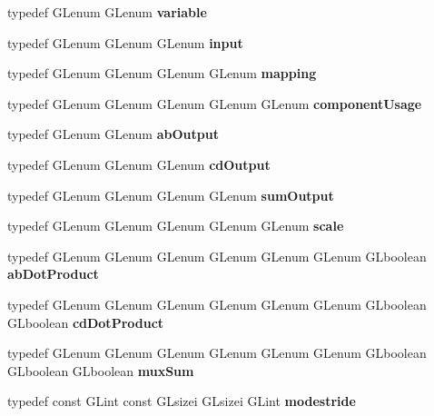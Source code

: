 \begin{DoxyCompactItemize}
\item 
typedef G\+Lenum G\+Lenum {\bfseries variable}\label{_s_d_l__opengl_8h_aac5473f0a0d0d38841ea8d37c5ca032d}

\item 
typedef G\+Lenum G\+Lenum G\+Lenum {\bfseries input}\label{_s_d_l__opengl_8h_ad3c78daa7d8673f71649d4840c641779}

\item 
typedef G\+Lenum G\+Lenum G\+Lenum G\+Lenum {\bfseries mapping}\label{_s_d_l__opengl_8h_aa4f194e5160ccbb5a8e83ab6ef4676d2}

\item 
typedef G\+Lenum G\+Lenum G\+Lenum G\+Lenum G\+Lenum {\bfseries component\+Usage}\label{_s_d_l__opengl_8h_ac91702bfd72ddae881fca64825724bc2}

\item 
typedef G\+Lenum G\+Lenum {\bfseries ab\+Output}\label{_s_d_l__opengl_8h_ae40bf1daeca8fbc317eb46964c1451e8}

\item 
typedef G\+Lenum G\+Lenum G\+Lenum {\bfseries cd\+Output}\label{_s_d_l__opengl_8h_aa8917040eb1ccf925b7f2ef21a3b18ee}

\item 
typedef G\+Lenum G\+Lenum G\+Lenum G\+Lenum {\bfseries sum\+Output}\label{_s_d_l__opengl_8h_aa7ae35809d7514d06d2260d713ed45d1}

\item 
typedef G\+Lenum G\+Lenum G\+Lenum G\+Lenum G\+Lenum {\bfseries scale}\label{_s_d_l__opengl_8h_a281421b881aa7a1266842b73a3bc7655}

\item 
typedef G\+Lenum G\+Lenum G\+Lenum G\+Lenum G\+Lenum G\+Lenum G\+Lboolean {\bfseries ab\+Dot\+Product}\label{_s_d_l__opengl_8h_a0aeebbcb74fc17c5b33b0e00c044e6b3}

\item 
typedef G\+Lenum G\+Lenum G\+Lenum G\+Lenum G\+Lenum G\+Lenum G\+Lboolean G\+Lboolean {\bfseries cd\+Dot\+Product}\label{_s_d_l__opengl_8h_a24af9ee71c286d2df0f68a2c503ff96b}

\item 
typedef G\+Lenum G\+Lenum G\+Lenum G\+Lenum G\+Lenum G\+Lenum G\+Lboolean G\+Lboolean G\+Lboolean {\bfseries mux\+Sum}\label{_s_d_l__opengl_8h_a674394192718069c0907bd12ac434c4a}

\item 
typedef const G\+Lint const G\+Lsizei G\+Lsizei G\+Lint {\bfseries modestride}\label{_s_d_l__opengl_8h_a949604a522cd5fb00632d480a579880e}


\end{DoxyCompactItemize}
